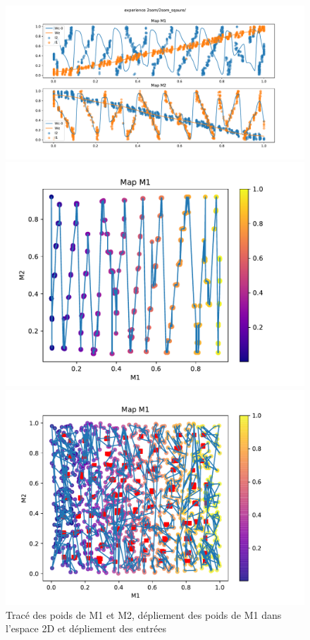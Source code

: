 \begin{figure}
\begin{minipage}{0.33\textwidth}
\includegraphics[width=\textwidth]{2som_square_w.pdf}
\end{minipage}
\begin{minipage}{0.33\textwidth}
\includegraphics[width=\textwidth]{2som_square_d.pdf}
\end{minipage}
\begin{minipage}{0.33\textwidth}
\includegraphics[width=\textwidth]{2som_square_din.pdf}
\end{minipage}
\label{fig:2som_square}
\caption{Tracé des poids de M1 et M2, dépliement des poids de M1 dans l'espace 2D et dépliement des entrées}
\end{figure}

